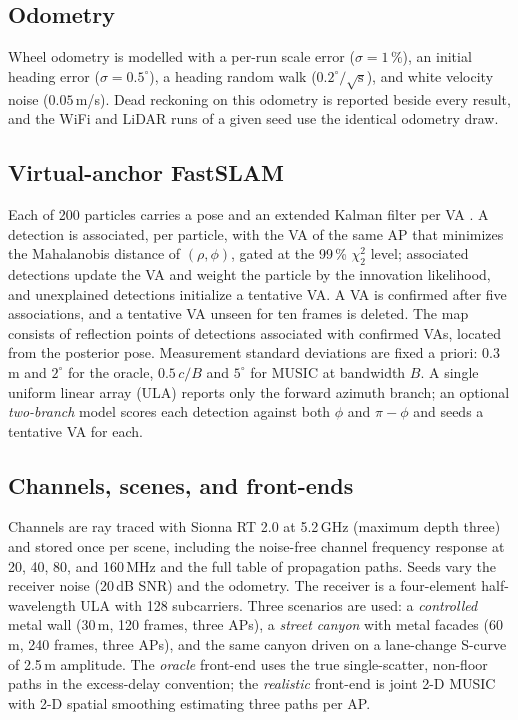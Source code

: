 \documentclass[preprint,12pt]{elsarticle}
\begin{document}
\subsection{Odometry}
Wheel odometry is modelled with a per-run scale error ($\sigma=1\,\%$), an initial heading error
($\sigma=0.5^\circ$), a heading random walk ($0.2^\circ/\sqrt{\mathrm{s}}$), and white velocity
noise ($0.05$\,m/s). Dead reckoning on this odometry is reported beside every result, and the
WiFi and LiDAR runs of a given seed use the identical odometry draw.

\subsection{Virtual-anchor FastSLAM}
Each of 200 particles carries a pose and an extended Kalman filter per VA
\cite{montemerlo2002fastslam}. A detection is associated, per particle, with the VA of the same AP
that minimizes the Mahalanobis distance of $(\rho,\phi)$, gated at the 99\,\% $\chi^2_2$ level;
associated detections update the VA and weight the particle by the innovation likelihood, and
unexplained detections initialize a tentative VA. A VA is confirmed after five associations, and
a tentative VA unseen for ten frames is deleted. The map consists of reflection points of
detections associated with confirmed VAs, located from the posterior pose. Measurement standard
deviations are fixed a priori: $0.3$\,m and $2^\circ$ for the oracle, $0.5\,c/B$ and $5^\circ$ for
MUSIC at bandwidth $B$. A single uniform linear array (ULA) reports only the forward azimuth
branch; an optional \emph{two-branch} model scores each detection against both $\phi$ and
$\pi-\phi$ and seeds a tentative VA for each.

\subsection{Channels, scenes, and front-ends}
Channels are ray traced with Sionna RT 2.0 \cite{hoydis2023sionnart} at 5.2\,GHz (maximum depth
three) and stored once per scene, including the noise-free channel frequency response at 20, 40,
80, and 160\,MHz and the full table of propagation paths. Seeds vary the receiver noise (20\,dB
SNR) and the odometry. The receiver is a four-element half-wavelength ULA with 128 subcarriers.
Three scenarios are used: a \emph{controlled} metal wall (30\,m, 120 frames, three APs), a
\emph{street canyon} with metal facades (60\,m, 240 frames, three APs), and the same canyon driven
on a lane-change S-curve of 2.5\,m amplitude. The \emph{oracle} front-end uses the true
single-scatter, non-floor paths in the excess-delay convention; the \emph{realistic} front-end is
joint 2-D MUSIC with 2-D spatial smoothing \cite{schmidt1986music,shan1985smoothing} estimating
three paths per AP.
\end{document}
